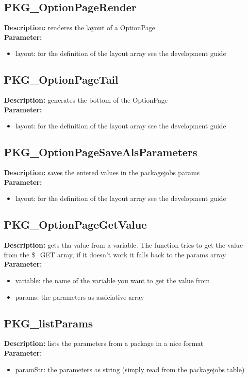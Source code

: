 \subsection{PKG\_OptionPageRender}
\textbf{Description:} renderes the layout of a OptionPage\\
\textbf{Parameter:}
\begin{itemize}
\item layout: for the definition of the layout array see the development guide
\end{itemize}

\subsection{PKG\_OptionPageTail}
\textbf{Description:} generates the bottom of the OptionPage\\
\textbf{Parameter:}
\begin{itemize}
\item layout: for the definition of the layout array see the development guide
\end{itemize}

\subsection{PKG\_OptionPageSaveAlsParameters}
\textbf{Description:} saves the entered values in the packagejobs params\\
\textbf{Parameter:}
\begin{itemize}
\item layout: for the definition of the layout array see the development guide
\end{itemize}

\subsection{PKG\_OptionPageGetValue}
\textbf{Description:} gets tha value from a variable. The function tries to get the value from the \$\_GET array, if it doesn't work it falls back to the params array\\
\textbf{Parameter:}
\begin{itemize}
\item variable: the name of the variable you want to get the value from
\item params: the parameters as assiciative array
\end{itemize}

\subsection{PKG\_listParams}
\textbf{Description:} lists the parameters from a package in a nice format\\
\textbf{Parameter:}
\begin{itemize}
\item paramStr: the parameters as string (simply read from the packagejobs table)
\end{itemize}

